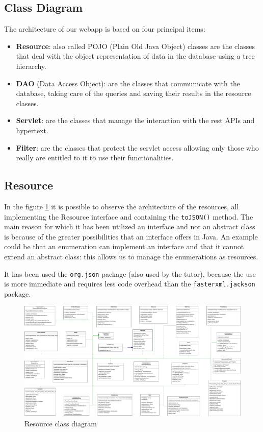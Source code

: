 \subsection{Class Diagram}

The architecture of our webapp is based on four principal items:
\begin{itemize}
    \item \textbf{Resource}: also called POJO (Plain Old Java Object) classes are the classes that deal with the object representation of data in the database using a tree hierarchy.
    \item \textbf{DAO} (Data Access Object): are the classes that communicate with the database, taking care of the queries and saving their results in the resource classes.
    \item \textbf{Servlet}: are the classes that manage the interaction with the rest APIs and hypertext.
    \item \textbf{Filter}: are the classes that protect the servlet access allowing only those who really are entitled to it to use their functionalities.
\end{itemize}

\subsection*{Resource}

In the figure \ref{fig:ResouceClassDiagram} it is possible to observe the 
architecture of the resources, all implementing the Resource interface 
and containing the \texttt{toJSON()} method. 
The main reason for which it has been utilized an interface and not an abstract 
class is because of the greater possibilities that an interface offers in 
Java. An example could be that an enumeration can implement an interface and that it cannot 
extend an abstract class: this allows us to manage the enumerations 
as resources.

It has been used the \texttt{org.json} package (also used by the tutor), because the 
use is more  immediate and requires less code overhead than the
\texttt{fasterxml.jackson} package.


\begin{figure}[H]
    \includegraphics[width=\textwidth,height=\textheight,keepaspectratio]{Schemas/resources.drawio.pdf}
    \caption{Resource class diagram}
    \label{fig:ResouceClassDiagram}
\end{figure}

